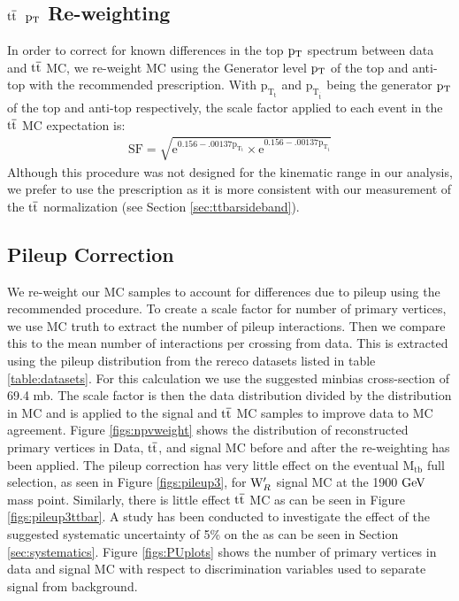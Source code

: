 \subsection{$\mathrm{t\overline{t}}$ $\mathrm{p_{T}}$ Re-weighting}
\label{sec:ttptrw}
In order to correct for known differences in the top $\mathrm{p_{T}}$ spectrum between data and $\mathrm{t\overline{t}}$ MC, we re-weight MC using the Generator level $\mathrm{p_{T}}$ of the top and anti-top with the recommended prescription.  
With $\mathrm{p_{T_{t}}}$ and $\mathrm{p_{T_{\overline{t}}}}$ being the generator $\mathrm{p_{T}}$ of the top and anti-top respectively, the scale factor applied to each event in the $\mathrm{t\overline{t}}$ MC expectation is:
\begin{eqnarray}
\mathrm{SF =\sqrt{e^{0.156-.00137p_{T_{t}}} \times e^{0.156-.00137p_{T_{\overline{t}}}}}}
\end{eqnarray}
Although this procedure was not designed for the kinematic range in our analysis, 
we prefer to use the prescription as it is more consistent with our measurement of the $\mathrm{t\overline{t}}$ normalization (see Section \ref{sec:ttbarsideband}).


\subsection{Pileup Correction}
\label{sec:pileup}
We re-weight our MC samples to account for differences due to pileup using the recommended procedure.  
To create a scale factor for number of primary vertices, we use MC truth to extract the number of pileup interactions.  
Then we compare this to the mean number of interactions per crossing from data.  
This is extracted using the pileup distribution from the rereco datasets listed in table \ref{table:datasets}.  
For this calculation we use the suggested minbias cross-section of 69.4 mb.  The scale factor is then 
the data distribution divided by the distribution in MC and is applied to the signal and $\mathrm{t\overline{t}}$ MC samples to improve 
data to MC agreement.
Figure \ref{figs:npvweight} shows the distribution of reconstructed primary vertices in Data, $\mathrm{t\overline{t}}$,
and signal MC before and after the re-weighting has been applied. The pileup correction has very little effect on the eventual $\mathrm{M_{tb}}$ full selection, as 
seen in Figure \ref{figs:pileup3}, for $\mathrm{W}^\prime_R$ signal MC at the 1900$~\mathrm{GeV}$ mass point. Similarly, there is little effect 
$\mathrm{t\overline{t}}$ MC as can be seen in Figure \ref{figs:pileup3ttbar}.  
A study has been conducted to investigate the effect of the suggested systematic uncertainty of 5\% on the  as can be seen in Section \ref{sec:systematics}.  
Figure \ref{figs:PUplots} shows the number of primary vertices in data and signal MC with respect to discrimination variables used to separate signal from background.

